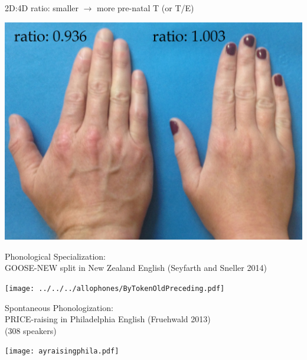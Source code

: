 \documentclass[hyperref={pdfpagelabels=false}]{beamer}
\begin{document}
\begin{frame}{2D:4D ratio: smaller $\rightarrow$ more pre-natal T (or T/E)}
\begin{center}
	\includegraphics[width=1.12\textwidth]{realhands2.jpg}
\end{center}
\end{frame}



\begin{frame}{Phonological Specialization: \\ \small{GOOSE-NEW split in New Zealand English (Seyfarth and Sneller 2014)}}

\begin{center}
\texttt{[image: ../../../allophones/ByTokenOldPreceding.pdf]}
\end{center}
\end{frame}


\begin{frame}{Spontaneous Phonologization: \\ \small{PRICE-raising in Philadelphia English (Fruehwald 2013)\\(308 speakers)}}

	
\texttt{[image: ayraisingphila.pdf]}

\end{frame}
\end{document}
